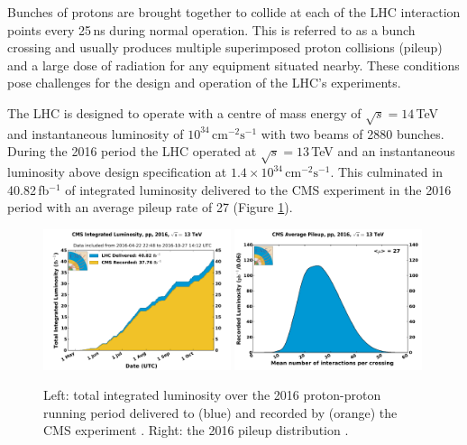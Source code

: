 Bunches of protons are brought together to collide at each of the LHC interaction points every 25\,ns during normal operation. This is referred to as a bunch crossing and usually produces multiple superimposed proton collisions (pileup) and a large dose of radiation for any equipment situated nearby. These conditions pose challenges for the design and operation of the LHC's experiments. 

The LHC is designed to operate with a centre of mass energy of $\sqrt{s}=14$\,TeV and instantaneous luminosity of $10^{34}$\,$\mathrm{cm}^{-2}\mathrm{s}^{-1}$ with two beams of 2880 bunches. During the 2016 period the LHC operated at $\sqrt{s} = 13$\,TeV and an instantaneous luminosity above design specification at $1.4\times{}10^{34}$\,$\mathrm{cm}^{-2}\mathrm{s}^{-1}$. This culminated in 40.82\,fb$^{-1}$ of integrated luminosity delivered to the CMS experiment in the 2016 period with an average pileup rate of 27 \cite{CMSLumiPublic} (Figure \ref{fig:apparatus:cms_int_lumi}).
\begin{figure}[h!]
    \begin{center}
    \includegraphics[width=0.49\textwidth]{figures/apparatus/int_lumi_per_day_cumulative_pp_2016.pdf}
    \includegraphics[width=0.49\textwidth]{figures/apparatus/pileup_pp_2016.pdf}
    \end{center}
    \caption{Left: total integrated luminosity over the 2016 proton-proton running period delivered to (blue) and recorded by (orange) the CMS experiment \cite{CMSLumiPublic}. Right: the 2016 pileup distribution \cite{CMSLumiPublic}.}
    \label{fig:apparatus:cms_int_lumi}
\end{figure}


